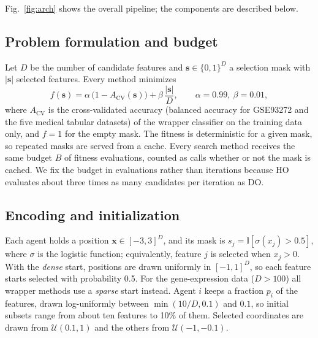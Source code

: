 \documentclass[journal]{IEEEtran}
\begin{document}
Fig.~\ref{fig:arch} shows the overall pipeline; the components are described below.

\subsection{Problem formulation and budget}
Let $D$ be the number of candidate features and $\mathbf{s}\in\{0,1\}^D$ a selection mask with $|\mathbf{s}|$ selected features. Every method minimizes
\begin{equation}
f(\mathbf{s}) = \alpha\,\bigl(1-A_{\mathrm{CV}}(\mathbf{s})\bigr) + \beta\,\frac{|\mathbf{s}|}{D}, \qquad \alpha=0.99,\ \beta=0.01,
\label{eq:fitness}
\end{equation}
where $A_{\mathrm{CV}}$ is the cross-validated accuracy (balanced accuracy for GSE93272 and the five medical tabular datasets) of the wrapper classifier on the training data only, and $f=1$ for the empty mask. The fitness is deterministic for a given mask, so repeated masks are served from a cache. Every search method receives the same budget $B$ of fitness evaluations, counted as calls whether or not the mask is cached. We fix the budget in evaluations rather than iterations because HO evaluates about three times as many candidates per iteration as DO.

\subsection{Encoding and initialization}
Each agent holds a position $\mathbf{x}\in[-3,3]^D$, and its mask is $s_j=\mathbb{I}[\sigma(x_j)>0.5]$, where $\sigma$ is the logistic function; equivalently, feature $j$ is selected when $x_j>0$. With the \emph{dense} start, positions are drawn uniformly in $[-1,1]^D$, so each feature starts selected with probability 0.5. For the gene-expression data ($D>100$) all wrapper methods use a \emph{sparse} start instead. Agent $i$ keeps a fraction $p_i$ of the features, drawn log-uniformly between $\min(10/D,0.1)$ and $0.1$, so initial subsets range from about ten features to 10\% of them. Selected coordinates are drawn from $\mathcal{U}(0.1,1)$ and the others from $\mathcal{U}(-1,-0.1)$.
\end{document}
